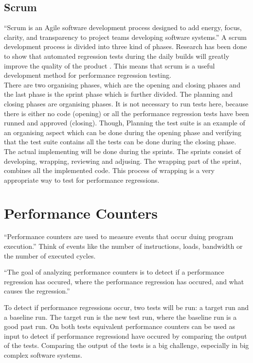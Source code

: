 \subsection{Scrum} 
``Scrum is an Agile software development process designed to add energy, focus, clarity, and transparency to project teams developing software systems.''\cite{sutherland2007distributed} A scrum development process is divided into three kind of phases. Research has been done to show that automated regression tests during the daily builds will greatly improve the quality of the product \cite{Future_of_Scrum}. This means that scrum is a useful development method for performance regression testing. \\ There are two organising phases, which are the opening and closing phases and the last phase is the sprint phase which is further divided. The planning and closing phases are organising phases. It is not necessary to run tests here, because there is either no code (opening) or all the performance regression tests have been runned and approved (closing). Though, Planning the test suite is an example of an organising aspect which can be done during the opening phase and verifying that the test suite contains all the tests can be done during the closing phase. \\ The actual implementing will be done during the sprints. The sprints consist of developing, wrapping, reviewing and adjusing. The wrapping part of the sprint, combines all the implemented code. This process of wrapping is a very appropriate way to test for performance regressions.

\section{Performance Counters}``Performance counters are used to measure events that occur duing program execution.''\cite{PC} Think of events like the number of instructions, loads, bandwidth or the number of executed cycles.

``The goal of analyzing performance counters is to detect if a performance regression has occured, where the performance regression has occured, and what causes the regression.'' \cite{nguyen2012using}

To detect if performance regressions occur, two tests will be run: a target run and a baseline run. The target run is the new test run, where the baseline run is a good past run. On both tests equivalent performance counters can be used as input to detect if performance regressiond have occured by comparing the output of the tests. Comparing the output of the tests is a big challenge, especially in big complex software systems.

